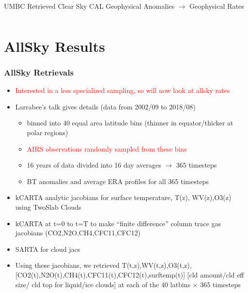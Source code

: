 \documentclass[10pt,t]{beamer}
\begin{document}
\begin{frame}{UMBC Retrieved Clear Sky CAL Geophysical Anomalies $\rightarrow$ Geophysical Rates}
\begin{columns}
\begin{column}{0.45\columnwidth}

\end{column}
\end{columns}
\end{frame}

\section{AllSky Results}

\begin{frame}
  \frametitle{AllSky Retrievals}
  \begin{itemize}
    \item \textcolor{red}{Interested in a less specialized sampling, so will now look at allsky rates}
    \item Larrabee's talk gives details (data from 2002/09 to 2018/08)
      \begin{itemize}
        \item binned into 40 equal area latitude bins (thinner in equator/thicker at polar regions)
        \item \textcolor{red}{AIRS observations randomly sampled from these bins}
        \item 16 years of data divided into 16 day averages $\rightarrow$ 365 timesteps
        \item BT anomalies and average ERA profiles for all 365 timesteps
      \end{itemize}
    \item kCARTA analytic jacobians for surface temperature, T(z), WV(z),O3(z) using TwoSlab Clouds
    \item kCARTA at t=0 to t=T to make ``finite difference'' column trace gas jacobians
          (CO2,N2O,CH4,CFC11,CFC12)
    \item SARTA for cloud jacs
    \item Using these jacobians, we retrieved T(t,z),WV(t,z),O3(t,z),[CO2(t),N2O(t),CH4(t),CFC11(t),CFC12(t),surftemp(t)]
          [cld amount/cld eff size/ cld top for liquid/ice clouds] at each of the 40 latbins $\times $ 365 timesteps
  \end{itemize}
\end{frame}
\end{document}
